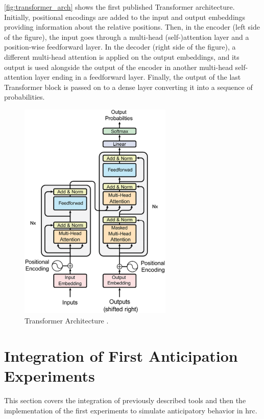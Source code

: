 \autoref{fig:transformer_arch} shows the first published Transformer architecture. Initially, positional encodings are added to the input and output embeddings providing information about the relative positions. Then, in the encoder (left side of the figure), the input goes through a multi-head (self-)attention layer and a position-wise feedforward layer. In the decoder (right side of the figure), a different multi-head attention is applied on the output embeddings, and its output is used alongside the output of the encoder in another multi-head self-attention layer ending in a feedforward layer. Finally, the output of the last Transformer block is passed on to a dense layer converting it into a sequence of probabilities.

\begin{figure}[ht]
    \centerline{\includegraphics[width=0.65\textwidth]{figs/transformer.pdf}}
    \caption[Transformer Architecture.]{Transformer Architecture \cite{Vaswani2017}.}
    \label{fig:transformer_arch}
\end{figure}

\section{Integration of First Anticipation Experiments}
\label{section:first_experiments}

This section covers the integration of previously described tools and then the implementation of the first experiments to simulate anticipatory behavior in \acs{hrc}.

